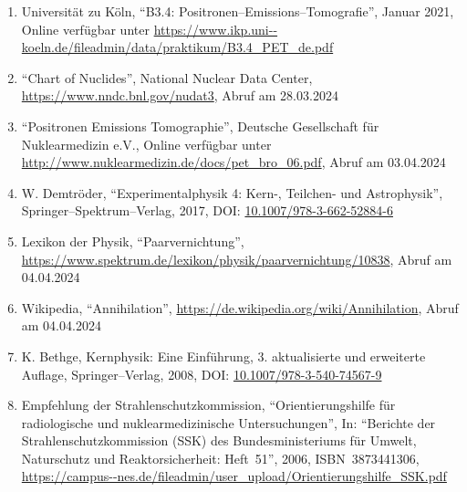\documentclass[12pt,a4paper]{scrartcl}
\numberwithin{equation}{section} %
\renewcommand{\[}{} %
\renewcommand{\]}{\noindent} %
\newcommand{\tightlist}{} %
\begin{document}
\begin{enumerate}
\def\labelenumi{\arabic{enumi}.}
\tightlist
\item
  Universität zu Köln, ``B3.4: Positronen--Emissions--Tomografie'',
  Januar 2021, Online verfügbar unter
  \url{https://www.ikp.uni--koeln.de/fileadmin/data/praktikum/B3.4\_PET\_de.pdf}
\item
  ``Chart of Nuclides'', National Nuclear Data Center,
  \url{https://www.nndc.bnl.gov/nudat3}, Abruf am 28.03.2024
\item
  ``Positronen Emissions Tomographie'', Deutsche Gesellschaft für
  Nuklearmedizin e.V., Online verfügbar unter
  \url{http://www.nuklearmedizin.de/docs/pet_bro_06.pdf}, Abruf am
  03.04.2024
\item
  W. Demtröder, ``Experimentalphysik 4: Kern-, Teilchen- und
  Astrophysik'', Springer--Spektrum--Verlag, 2017, DOI:
  \href{https://link.springer.com/book/10.1007/978-3-662-52884-6}{10.1007/978-3-662-52884-6}
\item
  Lexikon der Physik, ``Paarvernichtung'',
  \url{https://www.spektrum.de/lexikon/physik/paarvernichtung/10838},
  Abruf am 04.04.2024
\item
  Wikipedia, ``Annihilation'',
  \url{https://de.wikipedia.org/wiki/Annihilation}, Abruf am 04.04.2024
\item
  K. Bethge, Kernphysik: Eine Einführung, 3. aktualisierte und
  erweiterte Auflage, Springer--Verlag, 2008, DOI:
  \href{https://doi.org/10.1007/978-3-540-74567-9}{10.1007/978-3-540-74567-9}
\item
  Empfehlung der Strahlenschutzkommission, ``Orientierungshilfe für
  radiologische und nuklearmedizinische Untersuchungen'', In: ``Berichte
  der Strahlenschutzkommission (SSK) des Bundesministeriums für Umwelt,
  Naturschutz und Reaktorsicherheit: Heft~51'', 2006, ISBN~3873441306, \url{https://campus--nes.de/fileadmin/user\_upload/Orientierungshilfe\_SSK.pdf}
\end{enumerate}
\end{document}
